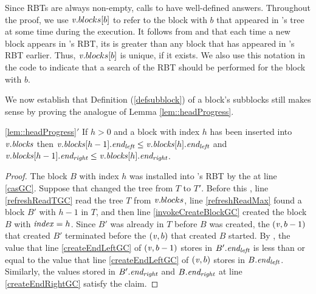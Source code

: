 Since RBTs are always non-empty, calls to  have well-defined answers.  
Throughout the proof, we use $\mbox{\textnormal{\textit{v}}}.blocks[b]$ to refer to the block with  $b$ that appeared
in 's tree at some time during the execution.
It follows from  and  that 
each time a new block appears in 's RBT, its  is greater than any block
that has appeared in 's RBT earlier.
Thus, $\mbox{\textnormal{\textit{v}}}.blocks[b]$ is unique, if it exists.
We also use this notation in the code to indicate that a search of the RBT should be performed for the block
with  $b$.

We now establish that Definition (\ref{defsubblock}) of a block's subblocks
still makes sense by proving the analogue of Lemma \ref{lem::headProgress}.



\begin{customlemma}{\ref{lem::headProgress}$'$}\label{lem::headProgressGC}
 If $h>0$ and a block with index $h$ has been inserted into $\mbox{\textnormal{\textit{v}}}.\mbox{\textit{blocks}}$ then 
 $\mbox{\textnormal{\textit{v}}}.\mbox{\textit{blocks}}[h-1].\mbox{\textit{end\textsubscript{left}}} \leq \mbox{\textnormal{\textit{v}}}.\mbox{\textit{blocks}}[h].\mbox{\textit{end\textsubscript{left}}}$ and 
 $\mbox{\textnormal{\textit{v}}}.\mbox{\textit{blocks}}[h-1].\mbox{\textit{end\textsubscript{right}}} \leq \mbox{\textnormal{\textit{v}}}.\mbox{\textit{blocks}}[h].\mbox{\textit{end\textsubscript{right}}}$.
\end{customlemma}
\begin{proof}
The block $B$ with index $h$ was installed into 's RBT by the  at line \ref{casGC}.
Suppose that  changed the tree from $T$ to $T'$.
Before this , line \ref{refreshReadTGC} read the tree $T$ from $\mbox{\textnormal{\textit{v}}}.blocks$,
line \ref{refreshReadMax} found a block $B'$  with  $h-1$ in $T$,
and then line \ref{invokeCreateBlockGC} created the block $B$ with $\mbox{\textit{index}}=h$.
Since $B'$ was already in $T$ before $B$ was created, the
$(\mbox{\textnormal{\textit{v}}},b-1)$ that created $B'$ terminated before the 
$(\mbox{\textnormal{\textit{v}}},b)$ that created $B$ started.
By , the value that line \ref{createEndLeftGC} of $(\mbox{\textnormal{\textit{v}}},b-1)$ 
stores in $B'.\mbox{\textit{end\textsubscript{left}}}$ is less than or equal to the value that line \ref{createEndLeftGC} 
of $(\mbox{\textnormal{\textit{v}}},b)$ stores in $B.\mbox{\textit{end\textsubscript{left}}}$.  
Similarly, the values stored in $B'.\mbox{\textit{end\textsubscript{right}}}$ and $B.\mbox{\textit{end\textsubscript{right}}}$ at line \ref{createEndRightGC} satisfy the claim.
\end{proof}

